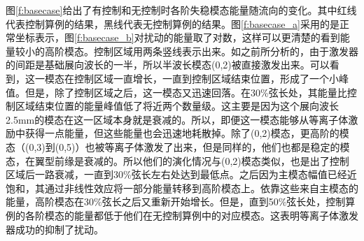 图\ref{f:basecase}给出了有控制和无控制时各阶失稳模态能量随流向的变化。其中红线代表控制算例的结果，黑线代表无控制算例的结果。图\ref{f:basecase_a}采用的是正常坐标表示，图\ref{f:basecase_b}对扰动的能量取了对数，这样可以更清楚的看到能量较小的高阶模态。控制区域用两条竖线表示出来。如之前所分析的，由于激发器的间距是基础展向波长的一半，所以半波长模态(0,2)被直接激发出来。可以看到，这一模态在控制区域一直增长，一直到控制区域结束位置，形成了一个小峰值。但是，除了控制区域之后，这一模态又迅速回落。在30\%弦长处，其能量比控制区域结束位置的能量峰值低了将近两个数量级。这主要是因为这个展向波长2.5mm的模态在这一区域本身就是衰减的。所以，即便这一模态能够从等离子体激励中获得一点能量，但这些能量也会迅速地耗散掉。除了(0,2)模态，更高阶的模态（(0,3)到(0,5)）也被等离子体激发了出来，但是同样的，他们也都是稳定的模态，在翼型前缘是衰减的。所以他们的演化情况与(0,2)模态类似，也是出了控制区域后一路衰减，一直到30\%弦长左右处达到最低点。之后因为主模态幅值已经近饱和，其通过非线性效应将一部分能量转移到高阶模态上。依靠这些来自主模态的能量，高阶模态在30\%弦长之后又重新开始增长。但是，直到50\%弦长处，控制算例的各阶模态的能量都低于他们在无控制算例中的对应模态。这表明等离子体激发器成功的抑制了扰动。

